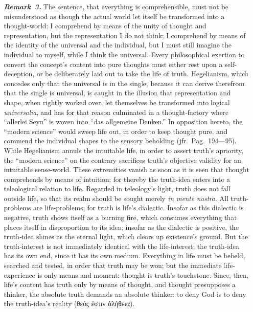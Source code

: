 \documentclass[12pt]{book}
\newcommand{\anm}[1]{\emph{\textbf{Remark~#1.}}}
\begin{document}
\anm{3} The sentence, that everything is comprehensible, must not be
misunderstood as though the actual world let itself be transformed into a
thought-world: I comprehend by means of the unity of thought and
representation, but the representation I do not think; I comprehend by means
of the identity of the universal and the individual, but I must still
imagine the individual to myself, while I think the universal. Every
philosophical exertion to convert the concept's content into pure thoughts
must either rest upon a self-deception, or be deliberately laid out to take
the life of truth. Hegelianism, which concedes only that the universal is in
the single, because it can derive therefrom that the single is universal, is
caught in the illusion that representation and shape, when rightly worked
over, let themselves be transformed into logical \textit{universalia}, and
has for that reason culminated in a thought-factory where ``allerlei Seyn''
is woven into ``das allgemeine Denken.'' In opposition hereto, the ``modern
science'' would sweep life out, in order to keep thought pure, and commend
the individual shapes to the sensory beholding (jfr.\ Pag.\ 194---95). While
Hegelianism annuls the intuitable life, in order to assert truth's
apriority, the ``modern science'' on the contrary sacrifices truth's
objective validity for an intuitable sense-world. These extremities vanish
as soon as it is seen that thought comprehends by means of intuition; for
thereby the truth-idea enters into a teleological relation to life.
Regarded in teleology's light, truth does not fall outside life, so that its
realm should be sought merely \textit{in mente nostra}. All truth-problems
are life-problems; for truth is life's dialectic. Insofar as this dialectic
is negative, truth shows itself as a burning fire, which consumes everything
that places itself in disproportion to its idea; insofar as the dialectic is
positive, the truth-idea shines as the eternal light, which clears up
existence's ground. But the truth-interest is not immediately identical with
the life-interest; the truth-idea has its own end, since it has its own
medium. Everything in life must be beheld, searched and tested, in order
that truth may be won; but the immediate life-experience is only means and
moment: thought is truth's touchstone. Since, then, life's content has truth
only by means of thought, and thought presupposes a thinker, the absolute
truth demands an absolute thinker: to deny God is to deny the truth-idea's
reality (θεός ἐστιν ἀλήθεια).
\end{document}
